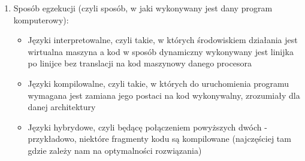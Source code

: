 \documentclass[skorowidz,skroty]{dyplomWEZUT}
\begin{document}
\begin{enumerate}

\item Sposób egzekucji (czyli sposób, w jaki wykonywany jest dany program komputerowy):
\begin{itemize}
	\item Języki interpretowalne, czyli takie, w których środowiskiem działania jest wirtualna maszyna a kod w sposób dynamiczny wykonywany jest linijka po linijce bez translacji na kod maszynowy danego procesora
	\item Języki kompilowalne, czyli takie, w których do uruchomienia programu wymagana jest zamiana jego postaci na kod wykonywalny, zrozumiały dla danej architektury
	\item Języki hybrydowe, czyli będącę połączeniem powyższych dwóch - przykładowo, niektóre fragmenty kodu są kompilowane (najczęściej tam gdzie zależy nam na optymalności rozwiązania)
\end{itemize}


\end{enumerate}
\end{document}
